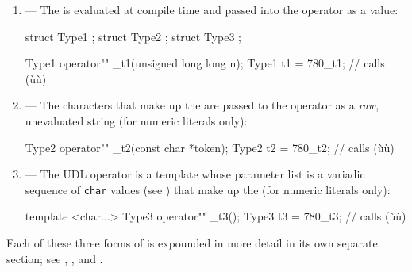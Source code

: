 \begin{enumerate}
\item{ — The  is evaluated at compile time and passed into the operator as a value:
\begin{emcppshiddenlisting}[emcppsbatch=e7]
struct Type1 {};
struct Type2 {};
struct Type3 {};
\end{emcppshiddenlisting}
\begin{emcppslisting}[emcppsbatch=e7]
Type1 operator"" _t1(unsigned long long n);
Type1 t1 = 780_t1;  // calls (ù{}ù)
\end{emcppslisting}
    }
\item{ — The characters that make up the  are passed to the operator as a \emph{raw}, unevaluated string (for numeric literals only):
\begin{emcppslisting}[emcppsbatch=e7]
Type2 operator"" _t2(const char *token);
Type2 t2 = 780_t2;  // calls (ù{}ù)
\end{emcppslisting}
    }
\item{ — The UDL operator is a template whose parameter list is a variadic sequence of \lstinline!char! values (see ) that make up the  (for numeric literals only):
\begin{emcppslisting}[emcppsbatch=e7]
template <char...> Type3 operator"" _t3();
Type3 t3 = 780_t3;  // calls (ù{}ù)
\end{emcppslisting}
    }
\end{enumerate}

Each of these three forms of  is expounded in more detail in its own separate section; see , , and .

